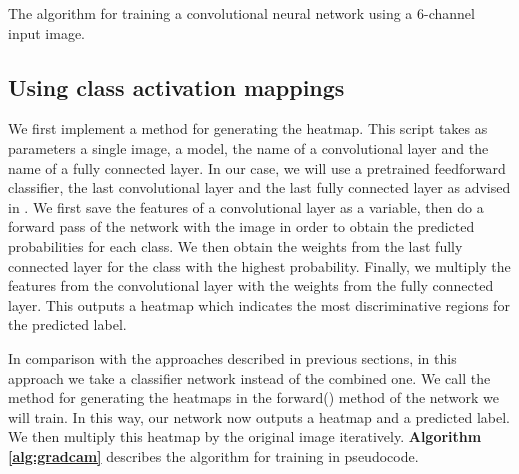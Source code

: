 \documentclass{l4proj}
\begin{document}
\begin{algorithm}
    \DontPrintSemicolon
    
\caption{The algorithm for training a convolutional neural network using a 6-channel input image. }
\label{alg:stacked}
\end{algorithm}

\subsection{Using class activation mappings}
\label{implgradcam}
We first implement a method for generating the heatmap. This script takes as parameters a single image, a model, the name of a convolutional layer and the name of a fully connected layer. In our case, we will use a pretrained feedforward classifier, the last convolutional layer and the last fully connected layer as advised in \cite{gradcam}. We first save the features of a convolutional layer as a variable, then do a forward pass of the network with the image in order to obtain the predicted probabilities for each class. We then obtain the weights from the last fully connected layer for the class with the highest probability. Finally, we multiply the features from the convolutional layer with the weights from the fully connected layer. This outputs a heatmap which indicates the most discriminative regions for the predicted label.

In comparison with the approaches described in previous sections, in this approach we take a classifier network instead of the combined one.
We call the method for generating the heatmaps in the forward() method of the network we will train. In this way, our network now outputs a heatmap and a predicted label. We then multiply this heatmap by the original image iteratively.
\textbf{Algorithm \ref{alg:gradcam}} describes the algorithm for training in pseudocode.
\end{document}
